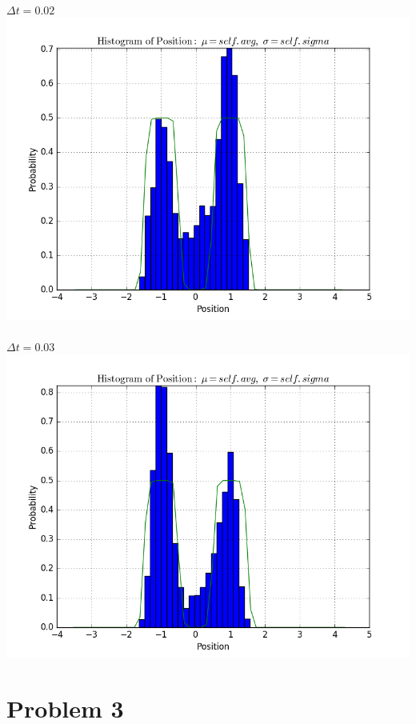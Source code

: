 \documentclass[11pt, oneside]{article}   	%
\begin{document}
\paragraph{}
$\Delta t = 0.02$
\includegraphics[scale = 0.5]{dt2.png}
\paragraph{}
$\Delta t = 0.03$
\includegraphics[scale = 0.5]{dt3.png}

\section{Problem 3}
\end{document}
